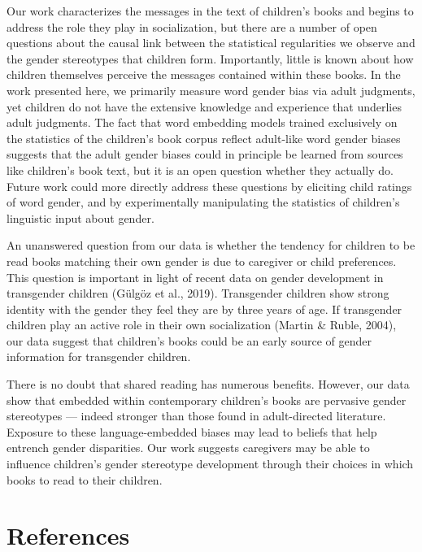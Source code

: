 \documentclass[
  english,
  ,man,floatsintext]{apa6}
\begin{document}
Our work characterizes the messages in the text of children's books and begins to address the role they play in socialization, but there are a number of open questions about the causal link between the statistical regularities we observe and the gender stereotypes that children form. Importantly, little is known about how children themselves perceive the messages contained within these books. In the work presented here, we primarily measure word gender bias via adult judgments, yet children do not have the extensive knowledge and experience that underlies adult judgments. The fact that word embedding models trained exclusively on the statistics of the children's book corpus reflect adult-like word gender biases suggests that the adult gender biases could in principle be learned from sources like children's book text, but it is an open question whether they actually do. Future work could more directly address these questions by eliciting child ratings of word gender, and by experimentally manipulating the statistics of children's linguistic input about gender.

An unanswered question from our data is whether the tendency for children to be read books matching their own gender is due to caregiver or child preferences. This question is important in light of recent data on gender development in transgender children (Gülgöz et al., 2019). Transgender children show strong identity with the gender they feel they are by three years of age. If transgender children play an active role in their own socialization (Martin \& Ruble, 2004), our data suggest that children's books could be an early source of gender information for transgender children.

There is no doubt that shared reading has numerous benefits. However, our data show that embedded within contemporary children's books are pervasive gender stereotypes --- indeed stronger than those found in adult-directed literature. Exposure to these language-embedded biases may lead to beliefs that help entrench gender disparities. Our work suggests caregivers may be able to influence children's gender stereotype development through their choices in which books to read to their children.

\newpage

\hypertarget{references}{%
\section{References}\label{references}}
\end{document}

